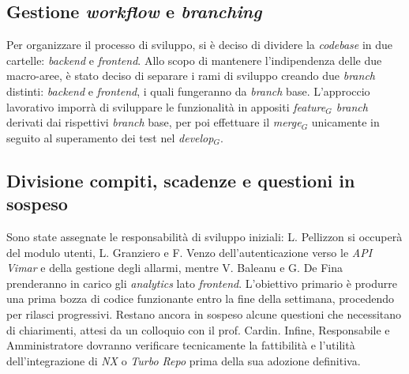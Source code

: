 \documentclass[10pt, letterpaper]{article}
\begin{document}
\subsection*{Gestione \textit{workflow} e \textit{branching}}
Per organizzare il processo di sviluppo, si è deciso di dividere la \textit{codebase} in due cartelle: \textit{backend} e \textit{frontend}.
Allo scopo di mantenere l'indipendenza delle due macro-aree, è stato deciso di separare i rami di sviluppo creando due \textit{branch} distinti: \textit{backend} e \textit{frontend},
i quali fungeranno da \textit{branch} base.
L'approccio lavorativo imporrà di sviluppare le funzionalità in appositi \textit{feature$_G$ branch} derivati dai rispettivi
\textit{branch} base, per poi effettuare il \textit{merge$_G$}
unicamente in seguito al superamento dei test nel \textit{develop$_G$}.

\subsection*{Divisione compiti, scadenze e questioni in sospeso}
Sono state assegnate le responsabilità di sviluppo iniziali: L. Pellizzon si occuperà del modulo utenti,
L. Granziero e F. Venzo dell'autenticazione verso le \textit{API Vimar} e della gestione degli allarmi, mentre V. Baleanu e G. De Fina prenderanno
in carico gli \textit{analytics} lato \textit{frontend}. L'obiettivo primario è produrre una prima bozza di codice
funzionante entro la fine della settimana, procedendo per rilasci progressivi.
Restano ancora in sospeso alcune questioni che necessitano di chiarimenti, attesi da un colloquio con il prof. Cardin.
Infine, Responsabile e Amministratore dovranno verificare tecnicamente la fattibilità e l'utilità dell'integrazione di \textit{NX} o \textit{Turbo Repo} prima della sua adozione
definitiva.

\makeDecisionTable
\end{document}
